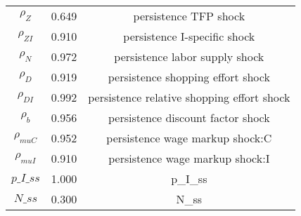 \begin{center}
\begin{longtable}{ccc}
${\rho_Z}$ 	 & 	 0.649 	 & 	 persistence TFP shock\\
${\rho_{ZI}}$ 	 & 	 0.910 	 & 	 persistence I-specific shock\\
${\rho_N}$ 	 & 	 0.972 	 & 	 persistence labor supply shock\\
${\rho_D}$ 	 & 	 0.919 	 & 	 persistence shopping effort shock\\
${\rho_{DI}}$ 	 & 	 0.992 	 & 	 persistence relative shopping effort shock\\
${\rho_b}$ 	 & 	 0.956 	 & 	 persistence discount factor shock\\
${\rho_{muC}}$ 	 & 	 0.952 	 & 	 persistence wage markup shock:C\\
${\rho_{muI}}$ 	 & 	 0.910 	 & 	 persistence wage markup shock:I\\
$p\_I\_ss$ 	 & 	 1.000 	 & 	 p\_I\_ss\\
$N\_ss$ 	 & 	 0.300 	 & 	 N\_ss\\
\bottomrule%
\end{longtable}
\end{center}
